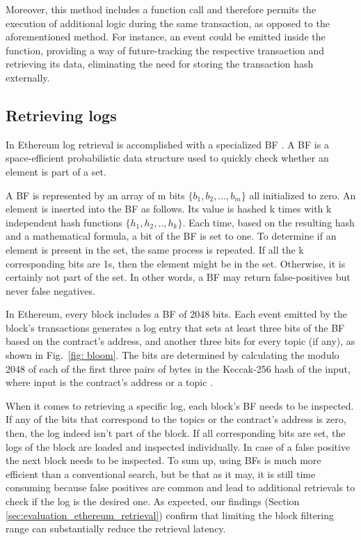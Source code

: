 Moreover, this method includes a function call and therefore permits the execution of additional logic during the same transaction, as opposed to the aforementioned method. For instance, an event could be emitted inside the function, providing a way of future-tracking the respective transaction and retrieving its data, eliminating the need for storing the transaction hash externally.

\subsection{Retrieving logs}\label{subsection:}
In Ethereum log retrieval is accomplished with a specialized BF  \citep{wood_2014}. A BF  \citep{broder_2004} is a space-efficient probabilistic data structure used to quickly check whether an element is part of a set. 

A BF is represented by an array of m bits $\{b_1, b_2,…, b_m\}$ all initialized to zero. An element is inserted into the BF as follows. Its value is hashed k times with k independent hash functions $\{h_1, h_2,.., h_k\}$. Each time, based on the resulting hash and a mathematical formula, a bit of the BF is set to one. To determine if an element is present in the set, the same process is repeated. If all the k corresponding bits are 1s, then the element might be in the set. Otherwise, it is certainly not part of the set. In other words, a BF may return false-positives but never false negatives.

In Ethereum, every block includes a BF of 2048 bits. Each event emitted by the block’s transactions generates a log entry that sets at least three bits of the BF based on the contract’s address, and another three bits for every topic (if any), as shown in Fig.~\ref{fig: bloom}. The bits are determined by calculating the modulo 2048 of each of the first three pairs of bytes in the Keccak-256 hash of the input, where input is the contract’s address or a topic  \citep{wood_2014}.

When it comes to retrieving a specific log, each block’s BF needs to be inspected. If any of the bits that correspond to the topics or the contract’s address is zero, then, the log indeed isn’t part of the block. If all corresponding bits are set, the logs of the block are loaded and inspected individually. In case of a false positive the next block needs to be inspected.
To sum up, using BFs is much more efficient than a conventional search, but be that as it may, it is still time consuming because false positives are common and lead to additional retrievals to check if the log is the desired one. As expected, our findings (Section \ref{sec:evaluation_ethereum_retrieval}) confirm that limiting the block filtering range can substantially reduce the retrieval latency.

